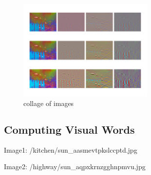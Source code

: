 \documentclass[11pt]{article} \usepackage{fullpage} \usepackage{graphicx} \usepackage{epstopdf} \usepackage{color} \usepackage{psfrag} \usepackage{pdfsync}\usepackage{indentfirst}\usepackage{subfigure}\usepackage{float}\usepackage[section]{placeins}
\begin{document}
\begin{figure}[htb]
\centering
\includegraphics[width=0.6\textwidth]{results/1_1_2_aquarium.png}
\caption{collage of images}
\end{figure}

\newpage
\setcounter{subsection}{2}
\subsection{Computing Visual Words}

Image1: /kitchen/sun\_aasmevtpkslccptd.jpg

\begin{figure}[H]
\centering
{}
\end{figure}

Image2: /highway/sun\_aqpxkrnzgghnpmvu.jpg
\end{document}
